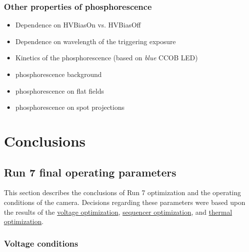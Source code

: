\subsubsection{Other properties of phosphorescence}
\begin{itemize}
\tightlist
\item
  Dependence on HVBiasOn vs. HVBiasOff
\item
  Dependence on wavelength of the triggering exposure
\item
  Kinetics of the phosphorescence (based on {\it blue} CCOB LED)
\end{itemize}


\begin{itemize}
\tightlist
\item
  phosphorescence background
\item
  phosphorescence on flat fields
\item
  phosphorescence on spot projections
\end{itemize}

\section{Conclusions}\label{conclusions}

\subsection{Run 7 final operating
parameters}\label{run-7-final-operating-parameters}

This section describes the conclusions of Run 7 optimization and the
operating conditions of the camera. Decisions regarding these parameters
were based upon the results of the
\href{https://sitcomtn-148.lsst.io/\#persistence-optimization}{voltage
optimization},
\href{https://sitcomtn-148.lsst.io/\#sequencer-optimization}{sequencer
optimization}, and
\href{https://sitcomtn-148.lsst.io/\#thermal-optimization}{thermal
optimization}.

\subsubsection{Voltage conditions}\label{voltage-conditions}

